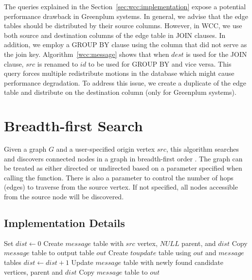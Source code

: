 The queries explained in the Section~\ref{sec:wcc:implementation} expose a
potential performance drawback in Greenplum systems. In general, we advise
that the edge tables should be distributed by their source columns. However,
in WCC, we use both source and destination columns of the edge table in JOIN
clauses. In addition, we employ a GROUP BY clause using the column that did
not serve as the join key. Algorithm~\ref{wcc:message} shows that when $dest$
is used for the JOIN clause, $src$ is renamed to $id$ to be used for GROUP BY
and vice versa. This query forces multiple redistribute motions in the
database which might cause performance degradation. To address this issue, we
create a duplicate of the edge table and distribute on the destination column
(only for Greenplum systems).

\section{Breadth-first Search} \label{sec:graph:bfs}

Given a graph $G$ and a user-specified origin vertex $src$, this algorithm
searches and discovers connected nodes in a graph in breadth-first order
\cite{bfs_wikipedia}. The graph can be treated as either directed or
undirected based on a parameter specified when calling the function.
There is also a parameter to control the number of hops (edges) to traverse
from the source vertex. If not specified, all nodes accessible from the
source node will be discovered.

\subsection{Implementation Details}
\begin{algorithm} \label{alg:bfs:high}
\begin{algorithmic}[1]
    \State Set $dist \leftarrow 0$
    \State Create $message$ table with $src$ vertex, $NULL$ parent, and $dist$
    \State Copy $message$ table to output table $out$
    \Repeat
        \State Create $toupdate$ table using $out$ and $message$ tables
        \State $dist \leftarrow dist + 1$
        \State Update $message$ table with newly found candidate vertices, parent and $dist$
        \State Copy $message$ table to $out$
\end{algorithmic}
\end{algorithm}

